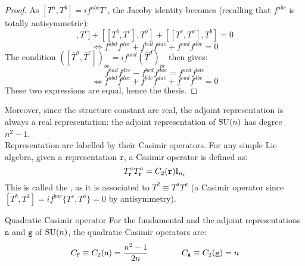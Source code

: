 \begin{proofbox}
  \begin{proof}
    As $ [T^a,T^b] = i f^{abc} T^c $, the Jacoby identity becomes (recalling that $ f^{abc} $ is totally antisymmetric):
    \begin{equation*}
      [[T^a,T^b],T^c] + [[T^b,T^c],T^a] + [[T^c,T^a],T^b] = 0
    \end{equation*}
    \begin{equation*}
      \iff f^{abd} f^{dce} + f^{bcd} f^{dae} + f^{cad} f^{dbe} = 0
    \end{equation*}
    The condition $ ([\bar{T}^a , \bar{T}^c])_{be} = i f^{acd} (\bar{T}^d)_{be} $ then gives:
    \begin{equation*}
      f^{bad} f^{dce} - f^{bcd} f^{dae} = f^{acd} f^{bde}
    \end{equation*}
    \begin{equation*}
      \iff f^{abd} f^{dce} + f^{bdc} f^{dae} + f^{cad} f^{dbe} = 0
    \end{equation*}
    These two expressions are equal, hence the thesis.
  \end{proof}
\end{proofbox}

Moreover, since the structure constant are real, the adjoint representation is always a real representation: the adjoint representation of $ \mathrm{SU}(n) $ has degree $ n^2 - 1 $.\\
Representation are labelled by their Casimir operators. For any simple Lie algebra, given a representation $ \mathtt{r} $, a Casimir operator is defined as:
\begin{equation}
  T^a_\mathtt{r} T^a_\mathtt{r} = C_2(\mathtt{r}) \mathrm{I}_{n_{\mathtt{r}}}
  \label{eq:quad-cas}
\end{equation}
This is called the , as it is associated to $ T^2 \equiv T^a T^a $ (a Casimir operator since $ [T^b, T^2] = i f^{bac} \{T^c,T^a\} = 0 $ by antisymmetry).

\begin{proposition}{Quadratic Casimir operator}{}
  For the fundamental and the adjoint representations $ \mathtt{n} $ and $ \mathtt{g} $ of $ \mathrm{SU}(n) $, the quadratic Casimir operators are:
  \begin{equation}
    C_\mathtt{F} \equiv C_2(\mathtt{n}) = \frac{n^2 - 1}{2n}
    \qquad \qquad
    C_\mathtt{A} \equiv C_2(\mathtt{g}) = n
  \end{equation}
\end{proposition}


